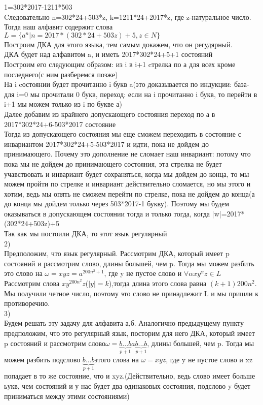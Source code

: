 \documentclass[a4paper,12pt]{article}
\begin{document}
1=302*2017-1211*503\\
Cледовательно n=302*24+503*z, k=1211*24+2017*z, где z-натуральное число.\\
Тогда наш алфавит содержит слова \\
$L=\lbrace a^n | n=2017*(302*24+503z)+5,z \in N \rbrace$\\
Построим ДКА для этого языка, тем самым докажем, что он регудярный.\\
ДКА будет над алфавитом {a}, и иметь 2017*302*24+5+1 состояний\\
Построим его следующим образом: из i в i+1 cтрелка по а для всех кроме последнего(с ним разберемся позже)\\
На i cостоянии будет прочитанно i букв a(это доказывается по индукции: база-для i=0 мы прочитали 0 букв, переход: если на i прочитанно i букв, то перейти в i+1 мы можем только из i по букве а)\\
Далее добавим из крайнего допускающего состояния переход по а в 2017*302*24+6-503*2017 состояние\\
Тогда из допускающего состояния мы еще сможем переходить в состояние с инвариантом 2017*302*24+5-503*2017 и идти, пока не дойдем до принимающего. Почему это дополнение не сломает наш инвариант: потому что пока мы не дойдем до принимающего состояния, эта стрелка не будет учавствовать и инвариант будет сохраняться, когда мы дойдем до конца, то мы можем пройти по стрелке и инвариант действительно сломается, но мы этого и хотим, ведь мы опять не сможем перейти по стрелке, пока не дойдем до конца(а до конца мы дойдем только через 503*2017-1 букву). Поэтому мы будем оказываться в допускающем состоянии тогда и только тогда, когда |w|=2017*(302*24+503z)+5\\
Так как мы постоили ДКА, то этот язык регулярный\\
2)\\
Предположим, что язык регулярный. Рассмотрим ДКА, который имеет p состояний и рассмотрим слово, длины большей, чем p. Тогда мы можем разбить это слово на $\omega=xyz=a^{200n^2+1}$, где y не пустое слово и $\forall \alpha xy^\alpha z \in L$\\
Рассмотрим слова $xy^{200n^2}z$($|y|=k$),тогда длина этого слова равна $(k+1)200n^2$. Мы получили четное число, поэтому это слово не принадлежит L и мы пришли к противоречию.\\
3)\\
Будем решать эту задачу для алфавита а,б. Аналогично предыдущему пункту предположим, что это регулярный язык, посторим для него ДКА, который имеет p состояний и рассмотрим слово$\omega=\underbrace{b...b}_{p+1} a \underbrace{b...b}_{p+1}$, длины большей, чем p. Тогда мы можем разбить подслово $\underbrace{b...b}_{p+1}$этого  слова на $\omega=xyz$, где y не пустое слово и xz попадает в то же состояние, что и xyz.(Действительно, ведь слово имеет больше ьукв, чем состояний и у нас будет два одинаковых состояния, подслово y  будет приниматься между этими состояниями)\\
\end{document}
